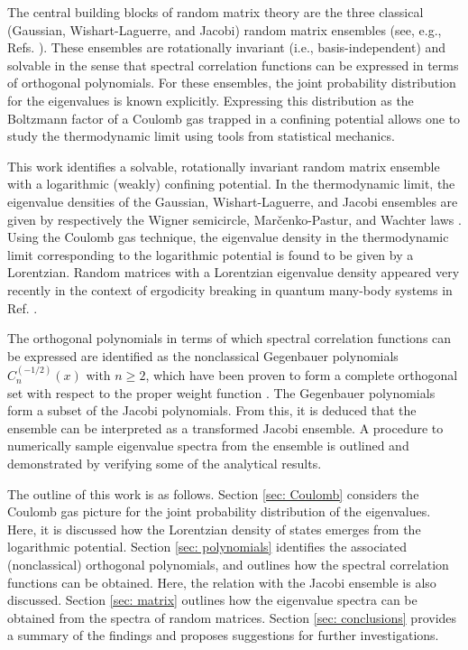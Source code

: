 \documentclass[aps, notitlepage, floatfix, pre, twocolumn]{revtex4-2}
\begin{document}
The central building blocks of random matrix theory are the three classical (Gaussian, Wishart-Laguerre, and Jacobi) random matrix ensembles (see, e.g., Refs. \cite{Forrester10, Livan18}). These ensembles are rotationally invariant (i.e., basis-independent) and solvable in the sense that spectral correlation functions can be expressed in terms of orthogonal polynomials. For these ensembles, the joint probability distribution for the eigenvalues is known explicitly. Expressing this distribution as the Boltzmann factor of a Coulomb gas trapped in a confining potential allows one to study the thermodynamic limit using tools from statistical mechanics.

This work identifies a solvable, rotationally invariant random matrix ensemble with a logarithmic (weakly) confining potential. In the thermodynamic limit, the eigenvalue densities of the Gaussian, Wishart-Laguerre, and Jacobi ensembles are given by respectively the Wigner semicircle, Mar\v{c}enko-Pastur, and Wachter laws \cite{Wachter78}. Using the Coulomb gas technique, the eigenvalue density in the thermodynamic limit corresponding to the logarithmic potential is found to be given by a Lorentzian. Random matrices with a Lorentzian eigenvalue density appeared very recently in the context of ergodicity breaking in quantum many-body systems in Ref. \cite{Venturelli22}. 

The orthogonal polynomials in terms of which spectral correlation functions can be expressed are identified as the nonclassical Gegenbauer polynomials $C_n^{(-1/2)}(x)$ with $n \ge 2$, which have been proven to form a complete orthogonal set with respect to the proper weight function \cite{Bruder14}. The Gegenbauer polynomials form a subset of the Jacobi polynomials. From this, it is deduced that the ensemble can be interpreted as a transformed Jacobi ensemble. A procedure to numerically sample eigenvalue spectra from the ensemble is outlined and demonstrated by verifying some of the analytical results.

The outline of this work is as follows. Section \ref{sec: Coulomb} considers the Coulomb gas picture for the joint probability distribution of the eigenvalues. Here, it is discussed how the Lorentzian density of states emerges from the logarithmic potential. Section \ref{sec: polynomials} identifies the associated (nonclassical) orthogonal polynomials, and outlines how the spectral correlation functions can be obtained. Here, the relation with the Jacobi ensemble is also discussed. Section \ref{sec: matrix} outlines how the eigenvalue spectra can be obtained from the spectra of random matrices. Section \ref{sec: conclusions} provides a summary of the findings and proposes suggestions for further investigations.
\end{document}
